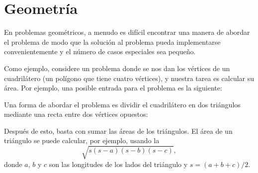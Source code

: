 \chapter{Geometría}


En problemas geométricos, a menudo es difícil
encontrar una manera de abordar el problema de modo que
la solución al problema pueda implementarse convenientemente
y el número de casos especiales sea pequeño.

Como ejemplo, considere un problema donde
se nos dan los vértices de un cuadrilátero
(un polígono que tiene cuatro vértices),
y nuestra tarea es calcular su área.
Por ejemplo, una posible entrada para el problema es la siguiente:

\begin{center}
\end{center}
Una forma de abordar el problema es dividir
el cuadrilátero en dos triángulos mediante una recta
entre dos vértices opuestos:
\begin{center}
\end{center}
Después de esto, basta con sumar las áreas
de los triángulos.
El área de un triángulo se puede calcular,
por ejemplo, usando la 
\[ \sqrt{s (s-a) (s-b) (s-c)},\]
donde $a$, $b$ y $c$ son las longitudes
de los lados del triángulo y
$s=(a+b+c)/2$.


